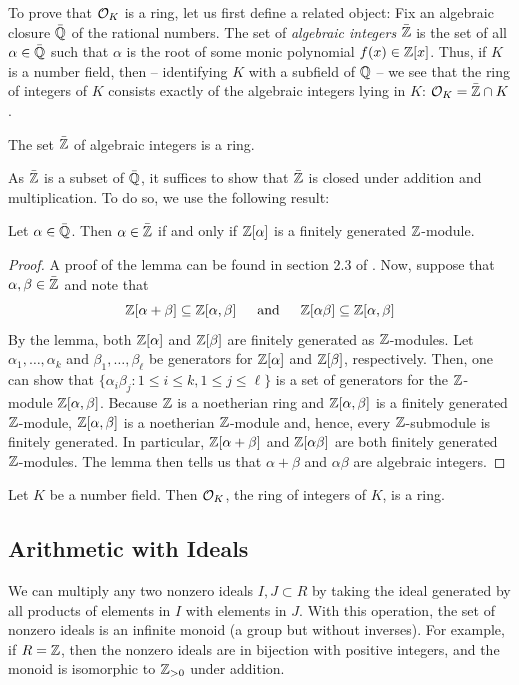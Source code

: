 \documentclass{book}
\begin{document}
To prove that $\mathcal{O}_K$ is a ring, let us first define a related object:  Fix
an algebraic closure $\bar{\mathbb{Q}}$ of the rational numbers.  The set of
\textit{algebraic integers} $\bar{\mathbb{Z}}$ is the set of all $\alpha \in \bar{\mathbb{Q}}$
such that $\alpha$ is the root of some monic polynomial $f(x) \in \mathbb{Z}[x]$.
Thus, if $K$ is a number field, then -- identifying $K$ with a subfield of
$\mathbb{Q}$ -- we see that the ring of integers of $K$ consists exactly of the
algebraic integers lying in $K$: $\mathcal{O}_K = \bar{\mathbb{Z}} \cap K$.
\begin{proposition}
The set $\bar{\mathbb{Z}}$ of algebraic integers is a ring.
\end{proposition}
As $\bar{\mathbb{Z}}$ is a subset of $\bar{\mathbb{Q}}$, it suffices to show that $\bar{\mathbb{Z}}$
is closed under addition and multiplication.  To do so, we use the following
result:
\begin{lemma}
Let $\alpha \in \bar{\mathbb{Q}}$.  Then $\alpha \in \bar{\mathbb{Z}}$ if and only if
$\mathbb{Z}[\alpha]$ is a finitely generated $\mathbb{Z}$-module.
\end{lemma}
\begin{proof}
A proof of the lemma can be found in section 2.3 of \cite{stein:ant}.  Now,
suppose that $\alpha, \beta \in \bar{\mathbb{Z}}$ and note that
$$
\mathbb{Z}[\alpha + \beta] \subseteq \mathbb{Z}[\alpha, \beta] \hspace{15pt}
  \text{and} \hspace{15pt} \mathbb{Z}[\alpha\beta] \subseteq \mathbb{Z}[\alpha, \beta]
$$
By the lemma, both $\mathbb{Z}[\alpha]$ and $\mathbb{Z}[\beta]$ are finitely generated as
$\mathbb{Z}$-modules.  Let $\alpha_1, \ldots, \alpha_k$ and
$\beta_1, \ldots, \beta_\ell$ be generators for $\mathbb{Z}[\alpha]$ and $\mathbb{Z}[\beta]$,
respectively.  Then, one can show that
$\{\alpha_i \beta_j: 1 \leq i \leq k, 1 \leq j \leq \ell\}$ is a set of
generators for the $\mathbb{Z}$-module $\mathbb{Z}[\alpha, \beta]$.  Because $\mathbb{Z}$ is a
noetherian ring and $\mathbb{Z}[\alpha, \beta]$ is a finitely generated $\mathbb{Z}$-module,
$\mathbb{Z}[\alpha,\beta]$ is a noetherian $\mathbb{Z}$-module and, hence, every $\mathbb{Z}$-submodule
is finitely generated.  In particular, $\mathbb{Z}[\alpha + \beta]$ and
$\mathbb{Z}[\alpha \beta]$ are both finitely generated $\mathbb{Z}$-modules.  The lemma then
tells us that $\alpha + \beta$ and $\alpha \beta$ are algebraic integers.
\end{proof}
\begin{corollary}
Let $K$ be a number field.  Then $\mathcal{O}_K$, the ring of integers of $K$, is a ring.
\end{corollary}


\subsection{Arithmetic with Ideals}
We can multiply any two nonzero ideals $I, J\subset R$ by taking
the ideal generated by all products of elements in $I$ with elements
in $J$.  With this operation, the set of nonzero ideals is an infinite
monoid (a group but without inverses).
For example, if $R=\mathbb{Z}$, then the nonzero ideals are in
bijection with positive integers, and the monoid is isomorphic to
$\mathbb{Z}_{>0}$ under addition.
\end{document}
